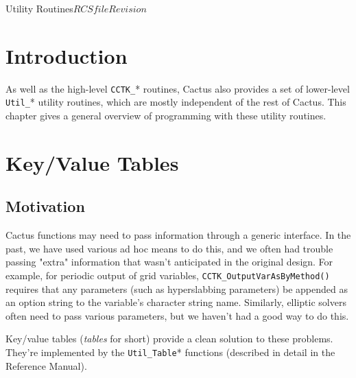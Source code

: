 
\begin{cactuspart}{Utility Routines}{$RCSfile$}{$Revision$}
\label{part:UtilityRoutines}
\renewcommand{\thepage}{\Alph{part}\arabic{page}}


\chapter{Introduction}

As well as the high-level \verb|CCTK_|* routines, Cactus also
provides a set of lower-level \verb|Util_|* utility routines, which
are mostly independent of the rest of Cactus.  This chapter gives a
general overview of programming with these utility routines.


\chapter{Key/Value Tables}


\section{Motivation}

Cactus functions may need to pass information through a generic
interface.  In the past, we have used various ad hoc means to do this,
and we often had trouble passing "extra" information that wasn't
anticipated in the original design.  For example, for periodic output
of grid variables,
\verb|CCTK_OutputVarAsByMethod()| requires that
any parameters (such as hyperslabbing parameters) be appended as an option
string to the variable's character string name.  Similarly, elliptic
solvers often need to pass various parameters, but we haven't had a
good way to do this.

Key/value tables (\textit{tables} for short) provide a clean solution
to these problems.  They're implemented by the \verb|Util_Table|*
functions (described in detail in the Reference Manual).


\end{cactuspart}
